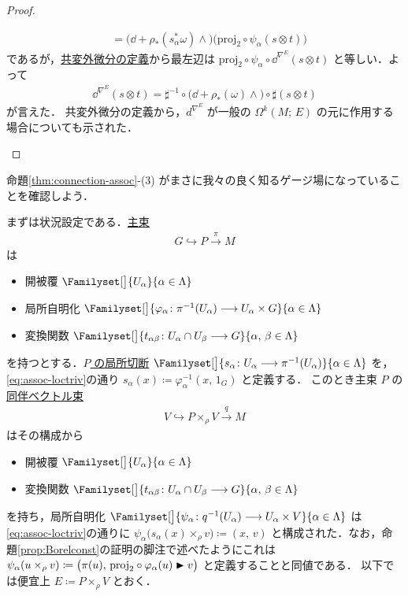 \documentclass[TQFT_main]{subfiles}
\begin{document}
\begin{proof}
\begin{enumerate}
\begin{align}
            &= \bigl( \dd + \rho_*(s_\alpha^*\omega) \wedge \bigr)  \bigl(\mathrm{proj}_2 \circ \psi_\alpha (s \otimes t) \bigr)
        \end{align}
        であるが，\hyperref[def:connection-vect]{共変外微分の定義}から最左辺は $\mathrm{proj}_2 \circ \psi_\alpha \circ \dd^{\nabla^E}(s \otimes t)$ と等しい．よって
        \begin{align}
            \dd^{\nabla^E} (s \otimes t) = \sharp^{-1} \circ \bigl( \dd + \rho_*(\omega) \wedge \bigr) \circ \sharp (s \otimes t)
        \end{align}
        が言えた．
        共変外微分の定義から，$d^{\nabla^E}$ が一般の $\Omega^k(M;\, E)$ の元に作用する場合についても示された．
    \end{enumerate}
\end{proof}

命題\ref{thm:connection-assoc}-(3) がまさに我々の良く知るゲージ場になっていることを確認しよう．

まずは状況設定である．\hyperref[def.PFD]{主束}
\begin{align}
    G \hookrightarrow P \xrightarrow{\pi} M
\end{align}
は
\begin{itemize}
    \item 開被覆 $\Familyset[\big]{U_\alpha}{\alpha \in \Lambda}$
    \item 局所自明化 $\Familyset[\big]{\varphi_\alpha \colon \pi^{-1}(U_\alpha) \lto U_\alpha \times G}{\alpha \in \Lambda}$ 
    \item 変換関数 $\Familyset[\big]{t_{\alpha\beta} \colon U_\alpha \cap U_\beta \lto G}{\alpha,\, \beta \in \Lambda}$
\end{itemize}
を持つとする．\underline{$P$ の}\hyperref[def.section]{局所切断} $\Familyset[\big]{s_\alpha \colon U_\alpha \lto \pi^{-1}(U_\alpha)}{\alpha \in \Lambda}$ を，\eqref{eq:assoc-loctriv}の通り $s_\alpha (x) \coloneqq \varphi_\alpha^{-1}(x,\, 1_G)$ と定義する．
このとき主束 $P$ の\hyperref[def:associated-vect]{同伴ベクトル束}
\begin{align}
    V \hookrightarrow P \times_\rho V \xrightarrow{q} M
\end{align}
はその構成から
\begin{itemize}
    \item 開被覆 $\Familyset[\big]{U_\alpha}{\alpha \in \Lambda}$
    \item 変換関数 $\Familyset[\big]{t_{\alpha\beta} \colon U_\alpha \cap U_\beta \lto G}{\alpha,\, \beta \in \Lambda}$
\end{itemize}
を持ち，局所自明化 $\Familyset[\big]{\psi_\alpha \colon q^{-1}(U_\alpha) \lto U_\alpha \times V}{\alpha \in \Lambda}$ は\eqref{eq:assoc-loctriv}の通りに $\psi_\alpha \bigl( s_\alpha(x) \times_\rho v \bigr) \coloneqq (x,\, v)$ と構成された．なお，命題\ref{prop:Borelconst}の証明の脚注で述べたようにこれは $\psi_\alpha(u \times_\rho v) \coloneqq \bigl( \pi(u),\, \mathrm{proj}_2 \circ \varphi_\alpha(u) \blacktriangleright v \bigr)$ と定義することと同値である．
以下では便宜上 $E \coloneqq P \times_\rho V$ とおく．
\end{document}
